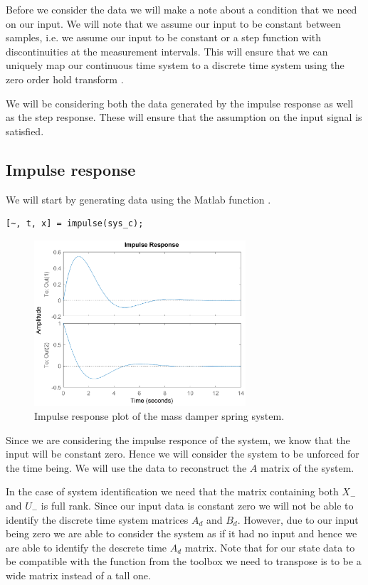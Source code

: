 Before we consider the data we will make a note about a condition that we need on our input. We will note that we assume our input to be constant between samples, i.e. we assume our input to be constant or a step function with discontinuities at the measurement intervals. This will ensure that we can uniquely map our continuous time system to a discrete time system using the zero order hold transform \cite{kollar1996equivalence}. 

We will be considering both the data generated by the impulse response as well as the step response. These will ensure that the assumption on the input signal is satisfied.

\subsection{Impulse response}
We will start by generating data using the Matlab function .

\begin{lstlisting}
[~, t, x] = impulse(sys_c);
\end{lstlisting}

\begin{figure}[H]
	\centering
	\includegraphics[width=0.7\textwidth]{impulse_response_msd.eps}
	\caption{Impulse response plot of the mass damper spring system.}
\end{figure}

Since we are considering the impulse responce of the system, we know that the input will be constant zero. Hence we will consider the system to be unforced for the time being. We will use the data to reconstruct the $A$ matrix of the system.

In the case of system identification we need that the matrix containing both $X_-$ and $U_-$ is full rank. Since our input data is constant zero we will not be able to identify the discrete time system matrices $A_d$ and $B_d$. However, due to our input being zero we are able to consider the system as if it had no input and hence we are able to identify the descrete time $A_d$ matrix. Note that for our state data to be compatible with the function from the toolbox we need to transpose is to be a wide matrix instead of a tall one.

